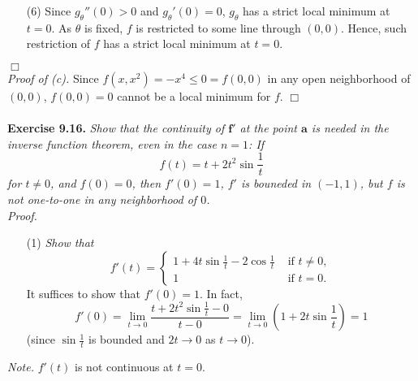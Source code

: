 \documentclass{article}
\begin{document}
\begin{enumerate}
\item[(6)]
  Since $g_{\theta}''(0) > 0$ and $g_{\theta}'(0) = 0$,
  $g_{\theta}$ has a strict local minimum at $t=0$.
  As $\theta$ is fixed, $f$ is restricted to some line through $(0,0)$.
  Hence, such restriction of $f$ has a strict local minimum at $t=0$.
\end{enumerate}
$\Box$ \\



\emph{Proof of (c).}
  Since $f(x,x^2) = -x^4 \leq 0 = f(0,0)$ in any open neighborhood of $(0,0)$,
  $f(0,0) = 0$ cannot be a local minimum for $f$.
$\Box$ \\\\






\textbf{Exercise 9.16.}
\emph{Show that the continuity of $\mathbf{f}'$ at the point $\mathbf{a}$
is needed in the inverse function theorem, even in the case $n=1$: If
\[
  f(t) = t + 2t^2 \sin \frac{1}{t}
\]
for $t \neq 0$, and $f(0) = 0$, then $f'(0) = 1$, $f'$ is bouneded in $(-1,1)$,
but $f$ is not one-to-one in any neighborhood of $0$.} \\

\emph{Proof.}
\begin{enumerate}
\item[(1)]
  \emph{Show that}
  \begin{equation*}
    f'(t) =
      \begin{cases}
        1 + 4t\sin\frac{1}{t} - 2\cos\frac{1}{t}
          & \text{ if $t \neq 0$}, \\
        1
          & \text{ if $t = 0$}.
      \end{cases}
  \end{equation*}
  It suffices to show that $f'(0) = 1$.
  In fact,
  \[
    f'(0)
    = \lim_{t \to 0} \frac{t + 2t^2 \sin \frac{1}{t} - 0}{t - 0}
    = \lim_{t \to 0} \left( 1 + 2t \sin \frac{1}{t} \right)
    = 1
  \]
  (since $\sin \frac{1}{t}$ is bounded and $2t \to 0$ as $t \to 0$).
\end{enumerate}

\emph{Note.} $f'(t)$ is not continuous at $t = 0$.
\end{document}
